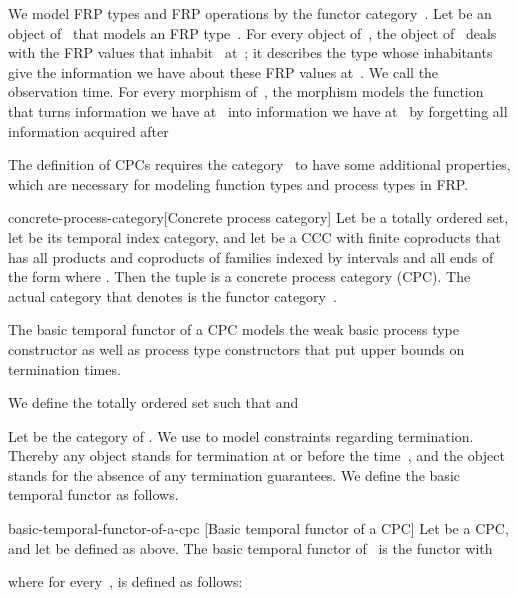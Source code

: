 \documentclass[copyright,creativecommons]{eptcs}
\begin{document}
We model FRP types and FRP operations by the functor category~. Let  be
an object of~ that models an FRP type~. For every object 
of~, the object  of~ deals with the FRP values that
inhabit~ at~; it describes the type whose inhabitants give the information
we have about these FRP values at~. We call  the observation
time. For every morphism  of~, the
morphism  models the function that turns
information we have at~ into information we have at~ by
forgetting all information acquired after~

The definition of CPCs requires the category~ to have some additional
properties, which are necessary for modeling function types and process types in
FRP.

\begin{extdefinition}{concrete-process-category}[Concrete process category]
Let  be a totally ordered set, let  be its temporal index category,
and let  be a CCC with finite coproducts that has all products and coproducts
of families indexed by intervals  and all ends of the form  where . Then the tuple  is a concrete process category (CPC). The actual category that  denotes is the functor category~.
\end{extdefinition}


The basic temporal functor of a CPC \cite[Subsection~4.3]{jeltsch:plpv-2014}
models the weak basic process type constructor as well as process type
constructors that put upper bounds on termination times.

We define the totally ordered set  such that  and

Let  be the category of . We use  to model constraints
regarding termination. Thereby any object  stands for
termination at or before the time~, and the object~ stands for
the absence of any termination guarantees. We define the basic temporal functor
as follows.

\begin{extdefinition}{basic-temporal-functor-of-a-cpc}
                     [Basic temporal functor of a CPC]
Let  be a CPC, and let  be defined as above. The basic temporal
functor of~ is the functor  with

where for every~,  is defined as follows:

\end{extdefinition}
\end{document}
